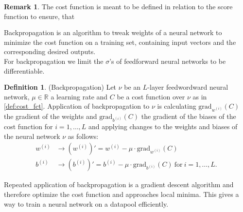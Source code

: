 \documentclass{article}
\theoremstyle{definition}
\newtheorem{definition}[theorem]{Definition}
\newtheorem{remark}[theorem]{Remark}
\begin{document}
\begin{remark}
The cost function is meant to be defined in relation to the score function to ensure, that
\end{remark}

Backpropagation is an algorithm to tweak weights of a neural network to minimize the cost function on a training set, containing input vectors and the corresponding desired outputs. \\
For backpropagation we limit the $\sigma$'s of feedforward neural networks to be differentiable.

\begin{definition}(Backpropagation)
Let $\nu$ be an $L$-layer feedwordward neural network, $\mu \in \mathbb{R}$ a learning rate and $C$ be a cost function over $\nu$ as in \ref{def:cost_fct}. Application of backpropagation to $\nu$ is calculating $\text{grad}_{w^{(i)}}(C)$ the gradient of the weights and $\text{grad}_{b^{(i)}}(C)$ the gradient of the biases of the cost function for $i = 1, \dots , L$ and applying changes to the weights and biases of the neural network $\nu$ as follows:
\begin{align*}
w^{(i)} &\to (w^{(i)})' = w^{(i)}-\mu \cdot \text{grad}_{w^{(i)}}(C) \\
b^{(i)} &\to (b^{(i)})' = b^{(i)}-\mu \cdot \text{grad}_{b^{(i)}}(C) \ \text{for} \ i = 1, \dots, L.
\end{align*}
\end{definition}

Repeated application of backpropagation is a gradient descent algorithm and therefore optimize the cost function and approaches local minima. This gives a way to train a neural network on a datapool efficiently.
\end{document}
